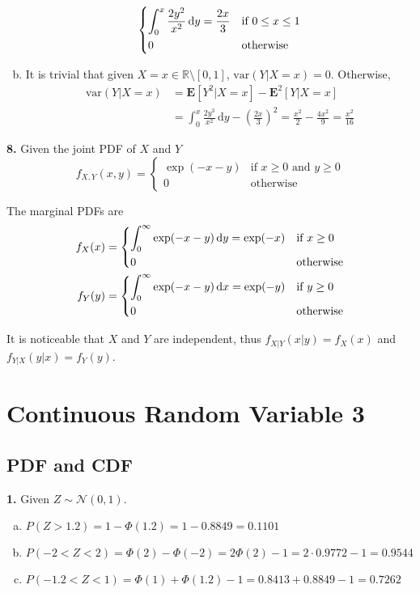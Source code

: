 \documentclass[a4paper,12pt]{article}
\newcommand{\E}{\mathbf E}
\newcommand{\N}{\mathcal N}
\newcommand{\ud}{\,\mathrm{d}}
\newcommand{\var}{\mathrm{var}}
\newcommand{\exercise}[1]{\noindent\textbf{#1.}}
\begin{document}
\begin{enumerate}[(a)]
\begin{align*}
\begin{dcases}
        \int_0^x\frac{2y^2}{x^2}\ud y = \frac{2x}{3} &\text{if }0 \le x \le 1\\
        0 &\text{otherwise}
      \end{dcases}
    \end{align*}
  \item It is trivial that given $X = x \in \mathbb R \setminus [0, 1]$,
    $\var(Y|X=x) = 0$. Otherwise,
    \begin{align*}
      \var(Y|X=x) &= \E\left[Y^2|X=x\right] - \E^2[Y|X=x]\\
      &= \int_0^x\frac{2y^3}{x^2}\ud y - \left(\frac{2x}{3}\right)^2
      = \frac{x^2}{2} - \frac{4x^2}{9} = \frac{x^2}{16}
    \end{align*}
\end{enumerate}

\exercise 8  Given the joint PDF of $X$ and $Y$
\[f_{X,Y}(x, y) = \begin{cases}
  \exp(-x-y) &\text{if }x \ge 0\text{ and }y \ge 0\\
  0 &\text{otherwise}
\end{cases}\]

The marginal PDFs are
\begin{align*}
  f_X(x) &= \begin{dcases}
    \int_0^\infty\exp(-x-y)\ud y = \exp(-x) &\text{if }x \ge 0\\
    0 &\text{otherwise}
  \end{dcases}\\
  f_Y(y) &= \begin{dcases}
    \int_0^\infty\exp(-x-y)\ud x = \exp(-y) &\text{if }y \ge 0\\
    0 &\text{otherwise}
  \end{dcases}
\end{align*}

It is noticeable that $X$ and $Y$ are independent,
thus $f_{X|Y}(x|y) = f_X(x)$ and $f_{Y|X}(y|x) = f_Y(y)$.
\pagebreak

\section{Continuous Random Variable 3}
\subsection{PDF and CDF}
\exercise 1  Given $Z \sim \N(0, 1)$.
\begin{enumerate}[(a)]
  \item $P(Z > 1.2) = 1 - \Phi(1.2) = 1 - 0.8849 = 0.1101$
  \item $P(-2 < Z < 2) = \Phi(2) - \Phi(-2) = 2\Phi(2) - 1
    = 2\cdot 0.9772 - 1 = 0.9544$
  \item $P(-1.2 < Z < 1) = \Phi(1) + \Phi(1.2) - 1
    = 0.8413 + 0.8849 - 1 = 0.7262$
\end{enumerate}
\end{document}
